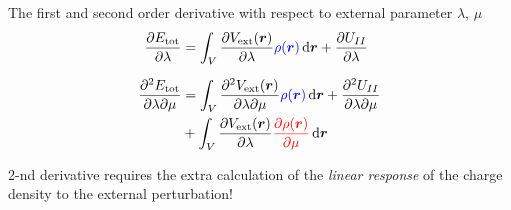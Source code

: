 \begin{frame}
  The first and second order derivative with respect to external parameter
  $\lambda$, $\mu$
   \begin{align}
    \frac{
      \partial E_{\text{tot}}
    }{
      \partial \lambda
    }
    &=
    \int_V
    \frac{
      \partial
      V_{\text{ext}}(\boldr)
    }{
      \partial \lambda
    }
    \mathcolor{blue}{\rho(\boldr)}
    \,\mathrm{d}\boldr
    +
    \frac{
      \partial
      U_{II}
    }{
      \partial \lambda
    } \label{eq:energy_1st_deriv}
    \\[6pt]
    \frac{
      \partial^2 E_{\text{tot}}
    }{
      \partial \lambda
      \partial \mu
    }
    &=
    \int_V
    \frac{
      \partial^2
      V_{\text{ext}}(\boldr)
    }{
      \partial \lambda
      \partial \mu
    }
    \mathcolor{blue}{\rho(\boldr)} \,\mathrm{d}\boldr
    +
    \frac{
      \partial^2 U_{II}
    }{
      \partial \lambda
      \partial \mu
    } \nonumber \\
    & +
    \int_V
    \frac{
      \partial
      V_{\text{ext}}(\boldr)
    }{
      \partial \lambda
    }
    \mathcolor{red}{
      \frac{
        \partial
        \rho(\boldr)
      }{
        \partial \mu
      }
    }
    \,\mathrm{d}\boldr \label{eq:energy_2nd_deriv}
  \end{align}

  2-nd derivative requires the extra calculation of the \textit{linear response}
  of the charge density to the external perturbation!

\end{frame}

